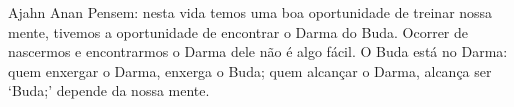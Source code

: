
\begin{quotepage}{0.65\linewidth}{Ajahn Anan}
Pensem: nesta vida temos uma boa oportunidade de treinar nossa mente,
tivemos a oportunidade de encontrar o Darma do Buda. Ocorrer de
nascermos e encontrarmos o Darma dele não é algo fácil. O Buda está no
Darma: quem enxergar o Darma, enxerga o Buda; quem alcançar o Darma,
alcança ser ‘Buda;’ depende da nossa mente.
\end{quotepage}

